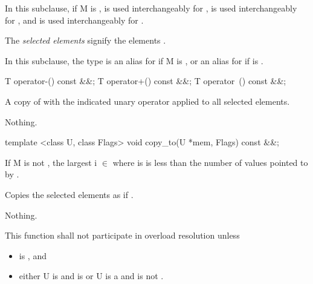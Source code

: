 \pnum In this subclause, if \type M is \bool,  is used interchangeably for ,
 is used interchangeably for , and
 is used interchangeably for .

\pnum The \emph{selected elements} signify the elements  .

\pnum In this subclause, the type  is an alias for  if \type M is \bool, or an alias for  if  is \true.

\pnum{}

\begin{itemdecl}
T operator-() const &&;
T operator+() const &&;
T operator~() const &&;
\end{itemdecl}
\begin{itemdescr}
  \pnum\returns A copy of  with the indicated unary operator applied to all selected elements.

  \pnum\throws Nothing.
\end{itemdescr}

\begin{itemdecl}
template <class U, class Flags> void copy_to(U *mem, Flags) const &&;
\end{itemdecl}
\begin{itemdescr}
   If \type M is not \bool, the largest i $\in$ \code{[0, M::size())} where  is \true is less than the number of values pointed to by .

  \pnum\effects Copies the selected elements as if  .

  \pnum\throws Nothing.

  \pnum\remarks This function shall not participate in overload resolution unless
  \begin{itemize}
      \item {} is \true, and
      \item either \type U is \bool and  is \bool or
          \type U is a \realArithmeticType and  is not \bool.
  \end{itemize}
\end{itemdescr}

